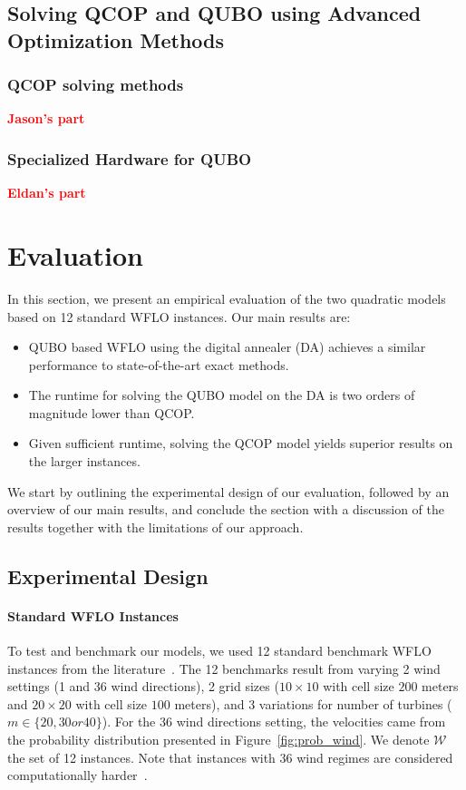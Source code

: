 \documentclass[preprint,12pt]{elsarticle}
\newcommand{\todo}[1]{{\textcolor{red}{\bf {#1}}}}
\begin{document}
\subsection{Solving QCOP and QUBO using Advanced Optimization Methods}

\subsubsection{QCOP solving methods}

\todo{Jason's part}

\subsubsection{Specialized Hardware for QUBO}

\todo{Eldan's part}


\section{Evaluation}
\label{sec:eval}

In this section, we 
present an empirical evaluation of the two quadratic models based on 
12 standard WFLO instances.
Our main results are: \begin{itemize}
	\item QUBO based WFLO using the digital annealer (DA) achieves a similar performance to state-of-the-art exact methods.
		\item The runtime for solving the QUBO model on the DA is two orders of magnitude lower than QCOP.  
	\item Given sufficient runtime, solving the QCOP model yields superior results on the larger instances.
\end{itemize}
We start by outlining the experimental design of our evaluation, followed by an overview of our main results,
and conclude the section with a discussion of the results together with the limitations of our approach.

\subsection{Experimental Design}



\paragraph{Standard WFLO Instances}

To test and benchmark our models, we used 12 standard benchmark WFLO instances
from the literature~\cite{MOSETTI1994105,Zhang2014,grady2005placement}. 
The 12 benchmarks result from varying 2 wind settings (1 and 36 wind directions),
2 grid sizes ($10\times10$ with cell size $200$ meters and $20\times20$ with cell size $100$ meters),
and 3 variations for number of turbines ($m \in \{20, 30 or 40\}$). 
For the $36$ wind directions setting, the velocities came from the probability distribution presented in Figure~\ref{fig:prob_wind}. We denote $\mathcal{W}$ the set of 12 instances. Note that instances with $36$ wind regimes are considered computationally harder~\cite{Zhang2014}.
\end{document}
